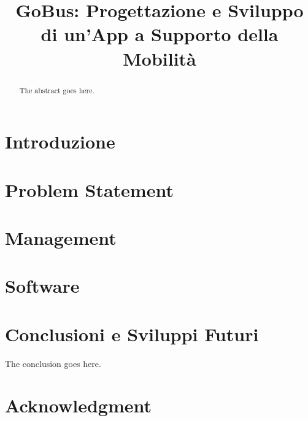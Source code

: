 \documentclass[conference]{IEEEtran}
\begin{document}
\title{GoBus: Progettazione e Sviluppo di un'App a Supporto della Mobilit\`{a}}

\author{}


\maketitle


\begin{abstract}

The abstract goes here.
\end{abstract}

\IEEEpeerreviewmaketitle



\section{Introduzione}
\label{intro}


\section{Problem Statement}
\label{PS}

\section{Management}
\label{management}



\section{Software}
\label{software}



\section{Conclusioni e Sviluppi Futuri}
The conclusion goes here.




\section*{Acknowledgment}
\end{document}
